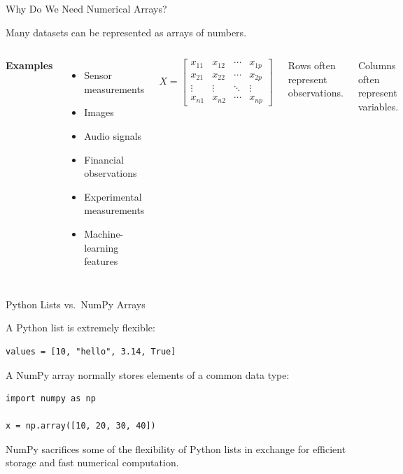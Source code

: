 \documentclass[11pt,aspectratio=43]{beamer}
\begin{document}
\begin{frame}{Why Do We Need Numerical Arrays?}

Many datasets can be represented as arrays of numbers.

\begin{columns}


\textbf{Examples}

\begin{itemize}
\item Sensor measurements
\item Images
\item Audio signals
\item Financial observations
\item Experimental measurements
\item Machine-learning features
\end{itemize}


\[
X =
\begin{bmatrix}
x_{11} & x_{12} & \cdots & x_{1p}\\
x_{21} & x_{22} & \cdots & x_{2p}\\
\vdots & \vdots & \ddots & \vdots\\
x_{n1} & x_{n2} & \cdots & x_{np}
\end{bmatrix}
\]

Rows often represent observations.

Columns often represent variables.

\end{columns}

\end{frame}

\begin{frame}[fragile]{Python Lists vs.\ NumPy Arrays}

A Python list is extremely flexible:

\begin{lstlisting}
values = [10, "hello", 3.14, True]
\end{lstlisting}

A NumPy array normally stores elements of a common data type:

\begin{lstlisting}
import numpy as np

x = np.array([10, 20, 30, 40])
\end{lstlisting}

\begin{block}{}
NumPy sacrifices some of the flexibility of Python lists in exchange
for efficient storage and fast numerical computation.
\end{block}

\end{frame}
\end{document}
